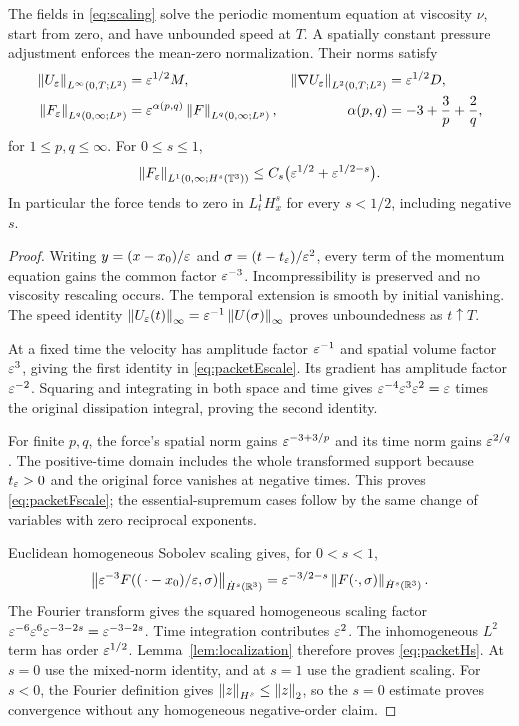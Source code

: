 \begin{proposition}\label{prop:scaling}
The fields in \eqref{eq:scaling} solve the periodic momentum equation at viscosity $\nu$, start from zero, and have unbounded speed at $T$. A spatially constant pressure adjustment enforces the mean-zero normalization. Their norms satisfy
\begin{align}
 \left\lVert U_\varepsilon\right\rVert_{L^\infty(0,T;L^2)}
    &=\varepsilon^{1/2}M,&
 \left\lVert\nabla U_\varepsilon\right\rVert_{L^2(0,T;L^2)}
    &=\varepsilon^{1/2}D,\label{eq:packetEscale}\\
 \left\lVert F_\varepsilon\right\rVert_{L^q(0,\infty;L^p)}
    &=\varepsilon^{\alpha(p,q)}\left\lVert F\right\rVert_{L^q(0,\infty;L^p)},&
 \alpha(p,q)&=-3+\frac3p+\frac2q,\label{eq:packetFscale}
\end{align}
for $1\le p,q\le\infty$. For $0\le s\le1$,
\begin{equation}\label{eq:packetHs}
 \left\lVert F_\varepsilon\right\rVert_{L^1(0,\infty;H^s(\mathbb T^3))}
 \le C_s\bigl(\varepsilon^{1/2}+\varepsilon^{1/2-s}\bigr).
\end{equation}
In particular the force tends to zero in $L^1_tH^s_x$ for every $s<1/2$, including negative $s$.
\end{proposition}
\begin{proof}
Writing $y=(x-x_0)/\varepsilon$ and $\sigma=(t-t_\varepsilon)/\varepsilon^2$, every term of the momentum equation gains the common factor $\varepsilon^{-3}$. Incompressibility is preserved and no viscosity rescaling occurs. The temporal extension is smooth by initial vanishing. The speed identity
$\left\lVert U_\varepsilon(t)\right\rVert_\infty=\varepsilon^{-1}\left\lVert U(\sigma)\right\rVert_\infty$
proves unboundedness as $t\uparrow T$.

At a fixed time the velocity has amplitude factor $\varepsilon^{-1}$ and spatial volume factor $\varepsilon^3$, giving the first identity in \eqref{eq:packetEscale}. Its gradient has amplitude factor $\varepsilon^{-2}$. Squaring and integrating in both space and time gives
$\varepsilon^{-4}\varepsilon^3\varepsilon^2=\varepsilon$ times the original dissipation integral, proving the second identity.

For finite $p,q$, the force's spatial norm gains $\varepsilon^{-3+3/p}$ and its time norm gains $\varepsilon^{2/q}$. The positive-time domain includes the whole transformed support because $t_\varepsilon>0$ and the original force vanishes at negative times. This proves \eqref{eq:packetFscale}; the essential-supremum cases follow by the same change of variables with zero reciprocal exponents.

Euclidean homogeneous Sobolev scaling gives, for $0<s<1$,
\[
 \left\lVert\varepsilon^{-3}F((\,\cdot-x_0)/\varepsilon,\sigma)\right\rVert
          _{\dot H^s(\mathbb R^3)}
 =\varepsilon^{-3/2-s}\left\lVert F(\cdot,\sigma)\right\rVert_{\dot H^s(\mathbb R^3)}.
\]
The Fourier transform gives the squared homogeneous scaling factor
$\varepsilon^{-6}\varepsilon^6\varepsilon^{-3-2s}=\varepsilon^{-3-2s}$.
Time integration contributes $\varepsilon^2$. The inhomogeneous $L^2$ term has order $\varepsilon^{1/2}$. Lemma~\ref{lem:localization} therefore proves \eqref{eq:packetHs}. At $s=0$ use the mixed-norm identity, and at $s=1$ use the gradient scaling. For $s<0$, the Fourier definition gives $\left\lVert z\right\rVert_{H^s}\le\left\lVert z\right\rVert_2$, so the $s=0$ estimate proves convergence without any homogeneous negative-order claim.
\end{proof}

